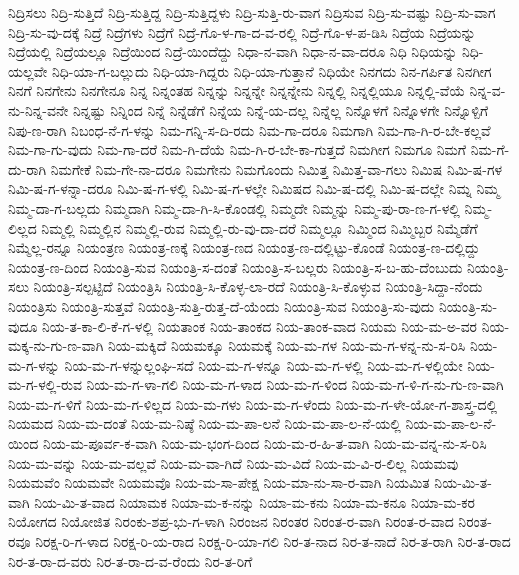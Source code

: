 {ನಿದ್ರಿಸಲು
ನಿದ್ರಿ-ಸುತ್ತಿದೆ
ನಿದ್ರಿ-ಸುತ್ತಿದ್ದ
ನಿದ್ರಿ-ಸುತ್ತಿದ್ದಳು
ನಿದ್ರಿ-ಸುತ್ತಿ-ರು-ವಾಗ
ನಿದ್ರಿಸುವ
ನಿದ್ರಿ-ಸು-ವಷ್ಟು
ನಿದ್ರಿ-ಸು-ವಾಗ
ನಿದ್ರಿ-ಸು-ವು-ದಕ್ಕೆ
ನಿದ್ರೆ
ನಿದ್ರೆಗಳು
ನಿದ್ರೆಗೆ
ನಿದ್ರೆ-ಗೊ-ಳ-ಗಾ-ದ-ವ-ರಲ್ಲಿ
ನಿದ್ರೆ-ಗೊ-ಳ-ಪ-ಡಿಸಿ
ನಿದ್ರೆಯ
ನಿದ್ರೆಯನ್ನು
ನಿದ್ರೆಯಲ್ಲಿ
ನಿದ್ರೆಯಲ್ಲೂ
ನಿದ್ರೆಯಿಂದ
ನಿದ್ರೆ-ಯಿಂದೆದ್ದು
ನಿಧಾ-ನ-ವಾಗಿ
ನಿಧಾ-ನ-ವಾ-ದರೂ
ನಿಧಿ
ನಿಧಿಯನ್ನು
ನಿಧಿ-ಯಲ್ಲವೇ
ನಿಧಿ-ಯಾ-ಗ-ಬಲ್ಲುದು
ನಿಧಿ-ಯಾ-ಗಿದ್ದರು
ನಿಧಿ-ಯಾ-ಗುತ್ತಾನೆ
ನಿಧಿಯೇ
ನಿನಗದು
ನಿನ-ಗರ್ಪಿತ
ನಿನಗೀಗ
ನಿನಗೆ
ನಿನಗೇನು
ನಿನಗೇನೂ
ನಿನ್ನ
ನಿನ್ನಂತಹ
ನಿನ್ನನ್ನು
ನಿನ್ನನ್ನೇ
ನಿನ್ನನ್ನೇನು
ನಿನ್ನಲ್ಲಿ
ನಿನ್ನಲ್ಲಿಯೂ
ನಿನ್ನಲ್ಲಿ-ವೆಯೆ
ನಿನ್ನ-ವ-ನು-ನಿನ್ನ-ವನೇ
ನಿನ್ನಷ್ಟು
ನಿನ್ನಿಂದ
ನಿನ್ನೆ
ನಿನ್ನೆಡೆಗೆ
ನಿನ್ನೆಯ
ನಿನ್ನೆ-ಯ-ದಲ್ಲ
ನಿನ್ನೆಲ್ಲ
ನಿನ್ನೊಳಗೆ
ನಿನ್ನೊಳಗೇ
ನಿನ್ನೊಳ್ಪಿಗೆ
ನಿಪು-ಣ-ರಾಗಿ
ನಿಬಂಧ-ನೆ-ಗ-ಳನ್ನು
ನಿಮ-ಗನ್ನಿ-ಸ-ದಿ-ರದು
ನಿಮ-ಗಾ-ದರೂ
ನಿಮಗಾಗಿ
ನಿಮ-ಗಾ-ಗಿ-ರ-ಬೇ-ಕಲ್ಲವೆ
ನಿಮ-ಗಾ-ಗು-ವುದು
ನಿಮ-ಗಾ-ದರೆ
ನಿಮ-ಗಿ-ದೆಯೆ
ನಿಮ-ಗಿ-ರ-ಬೇ-ಕಾ-ಗುತ್ತದೆ
ನಿಮಗೀಗ
ನಿಮಗೂ
ನಿಮಗೆ
ನಿಮ-ಗೆ-ದು-ರಾಗಿ
ನಿಮಗೇಕೆ
ನಿಮ-ಗೇ-ನಾ-ದರೂ
ನಿಮಗೇನು
ನಿಮಗೊಂದು
ನಿಮಿತ್ತ
ನಿಮಿತ್ತ-ವಾ-ಗಲು
ನಿಮಿಷ
ನಿಮಿ-ಷ-ಗಳ
ನಿಮಿ-ಷ-ಗ-ಳನ್ನಾ-ದರೂ
ನಿಮಿ-ಷ-ಗ-ಳಲ್ಲಿ
ನಿಮಿ-ಷ-ಗ-ಳಲ್ಲೇ
ನಿಮಿಷದ
ನಿಮಿ-ಷ-ದಲ್ಲಿ
ನಿಮಿ-ಷ-ದಲ್ಲೇ
ನಿಮ್ನ
ನಿಮ್ಮ
ನಿಮ್ಮ-ದಾ-ಗ-ಬಲ್ಲದು
ನಿಮ್ಮದಾಗಿ
ನಿಮ್ಮ-ದಾ-ಗಿ-ಸಿ-ಕೊಂಡಲ್ಲಿ
ನಿಮ್ಮದೇ
ನಿಮ್ಮನ್ನು
ನಿಮ್ಮ-ಪು-ರಾ-ಣ-ಗ-ಳಲ್ಲಿ
ನಿಮ್ಮ-ಲಿಲ್ಲದ
ನಿಮ್ಮಲ್ಲಿ
ನಿಮ್ಮಲ್ಲಿನ
ನಿಮ್ಮಲ್ಲಿ-ರುವ
ನಿಮ್ಮಲ್ಲಿ-ರು-ವು-ದಾ-ದರೆ
ನಿಮ್ಮಲ್ಲೂ
ನಿಮ್ಮಿಂದ
ನಿಮ್ಮಿಬ್ಬರ
ನಿಮ್ಮೆಡೆಗೆ
ನಿಮ್ಮೆಲ್ಲ-ರನ್ನೂ
ನಿಯಂತ್ರಣ
ನಿಯಂತ್ರ-ಣಕ್ಕೆ
ನಿಯಂತ್ರ-ಣದ
ನಿಯಂತ್ರ-ಣ-ದಲ್ಲಿಟ್ಟು-ಕೊಂಡೆ
ನಿಯಂತ್ರ-ಣ-ದಲ್ಲಿದ್ದು
ನಿಯಂತ್ರ-ಣ-ದಿಂದ
ನಿಯಂತ್ರಿ-ಸುವ
ನಿಯಂತ್ರಿ-ಸ-ದಂತೆ
ನಿಯಂತ್ರಿ-ಸ-ಬಲ್ಲರು
ನಿಯಂತ್ರಿ-ಸ-ಬ-ಹು-ದೆಂಬುದು
ನಿಯಂತ್ರಿ-ಸಲು
ನಿಯಂತ್ರಿ-ಸಲ್ಪಟ್ಟಿದೆ
ನಿಯಂತ್ರಿಸಿ
ನಿಯಂತ್ರಿ-ಸಿ-ಕೊಳ್ಳ-ಲಾ-ರದೆ
ನಿಯಂತ್ರಿ-ಸಿ-ಕೊಳ್ಳುವ
ನಿಯಂತ್ರಿ-ಸಿದ್ದಾ-ನೆಂದು
ನಿಯಂತ್ರಿಸು
ನಿಯಂತ್ರಿ-ಸುತ್ತವೆ
ನಿಯಂತ್ರಿ-ಸುತ್ತಿ-ರುತ್ತ-ದೆ-ಯೆಂದು
ನಿಯಂತ್ರಿ-ಸುವ
ನಿಯಂತ್ರಿ-ಸು-ವುದು
ನಿಯಂತ್ರಿ-ಸು-ವುದೂ
ನಿಯ-ತ-ಕಾ-ಲಿ-ಕೆ-ಗ-ಳಲ್ಲಿ
ನಿಯತಾಂಕ
ನಿಯ-ತಾಂಕದ
ನಿಯ-ತಾಂಕ-ವಾದ
ನಿಯಮ
ನಿಯ-ಮ-ಅ-ವರ
ನಿಯ-ಮಕ್ಕ-ನು-ಗು-ಣ-ವಾಗಿ
ನಿಯ-ಮಕ್ಕಿದೆ
ನಿಯಮಕ್ಕೂ
ನಿಯಮಕ್ಕೆ
ನಿಯ-ಮ-ಗಳ
ನಿಯ-ಮ-ಗ-ಳನ್ನ-ನು-ಸ-ರಿಸಿ
ನಿಯ-ಮ-ಗ-ಳನ್ನು
ನಿಯ-ಮ-ಗ-ಳನ್ನುಲ್ಲಂಘಿ-ಸದೆ
ನಿಯ-ಮ-ಗ-ಳನ್ನೂ
ನಿಯ-ಮ-ಗ-ಳಲ್ಲಿ
ನಿಯ-ಮ-ಗ-ಳಲ್ಲಿಯೇ
ನಿಯ-ಮ-ಗ-ಳಲ್ಲಿ-ರುವ
ನಿಯ-ಮ-ಗ-ಳಾ-ಗಲಿ
ನಿಯ-ಮ-ಗ-ಳಾದ
ನಿಯ-ಮ-ಗ-ಳಿಂದ
ನಿಯ-ಮ-ಗ-ಳಿ-ಗ-ನು-ಗು-ಣ-ವಾಗಿ
ನಿಯ-ಮ-ಗ-ಳಿಗೆ
ನಿಯ-ಮ-ಗ-ಳಿಲ್ಲದ
ನಿಯ-ಮ-ಗಳು
ನಿಯ-ಮ-ಗ-ಳೆಂದು
ನಿಯ-ಮ-ಗ-ಳೇ-ಯೋ-ಗ-ಶಾಸ್ತ್ರ-ದಲ್ಲಿ
ನಿಯಮದ
ನಿಯ-ಮ-ದಂತೆ
ನಿಯ-ಮ-ನಿಷ್ಠೆ
ನಿಯ-ಮ-ಪಾ-ಲನೆ
ನಿಯ-ಮ-ಪಾ-ಲ-ನೆ-ಯಲ್ಲಿ
ನಿಯ-ಮ-ಪಾ-ಲ-ನೆ-ಯಿಂದ
ನಿಯ-ಮ-ಪೂರ್ವ-ಕ-ವಾಗಿ
ನಿಯ-ಮ-ಭಂಗ-ದಿಂದ
ನಿಯ-ಮ-ರ-ಹಿ-ತ-ವಾಗಿ
ನಿಯ-ಮ-ವನ್ನ-ನು-ಸ-ರಿಸಿ
ನಿಯ-ಮ-ವನ್ನು
ನಿಯ-ಮ-ವಲ್ಲವೆ
ನಿಯ-ಮ-ವಾ-ಗಿದೆ
ನಿಯ-ಮ-ವಿದೆ
ನಿಯ-ಮ-ವಿ-ರ-ಲಿಲ್ಲ
ನಿಯಮವು
ನಿಯಮವೆಂ
ನಿಯಮವೇ
ನಿಯಮವೊ
ನಿಯ-ಮ-ಸಾ-ಪೇಕ್ಷ
ನಿಯ-ಮಾ-ನು-ಸಾ-ರ-ವಾಗಿ
ನಿಯಮಿತ
ನಿಯ-ಮಿ-ತ-ವಾಗಿ
ನಿಯ-ಮಿ-ತ-ವಾದ
ನಿಯಾಮಕ
ನಿಯಾ-ಮ-ಕ-ನನ್ನು
ನಿಯಾ-ಮ-ಕನು
ನಿಯಾ-ಮ-ಕನೂ
ನಿಯಾ-ಮ-ಕರ
ನಿಯೋಗದ
ನಿಯೋಜಿತ
ನಿರಂಕು-ಶಪ್ರ-ಭು-ಗ-ಳಾಗಿ
ನಿರಂಜನ
ನಿರಂತರ
ನಿರಂತ-ರ-ವಾಗಿ
ನಿರಂತ-ರ-ವಾದ
ನಿರಂತ-ರವೂ
ನಿರಕ್ಷ-ರಿ-ಗ-ಳಾದ
ನಿರಕ್ಷ-ರಿ-ಯ-ರಾದ
ನಿರಕ್ಷ-ರಿ-ಯಾ-ಗಲಿ
ನಿರ-ತ-ನಾದ
ನಿರ-ತ-ನಾದೆ
ನಿರ-ತ-ರಾಗಿ
ನಿರ-ತ-ರಾದ
ನಿರ-ತ-ರಾ-ದ-ವರು
ನಿರ-ತ-ರಾ-ದ-ವ-ರೆಂದು
ನಿರ-ತ-ರಿಗೆ
}
